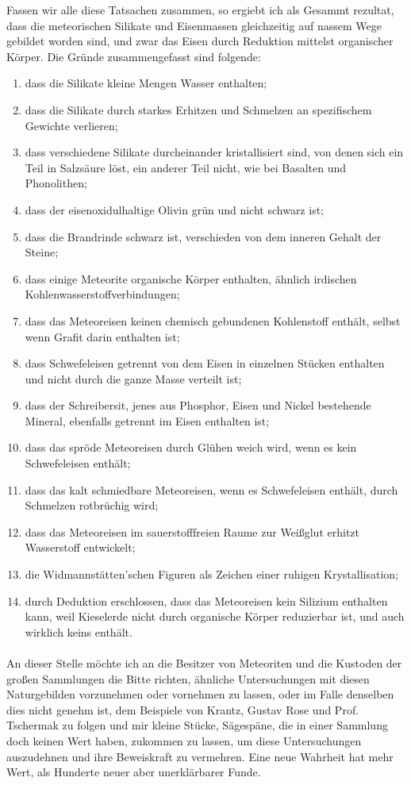 \documentclass[a4paper, 11pt, oneside, german]{article}
\begin{document}
Fassen wir alle diese Tatsachen zusammen, so ergiebt ich als Gesammt rezultat, dass die meteorischen Silikate und Eisenmassen gleichzeitig auf nassem Wege gebildet worden sind, und zwar das Eisen durch Reduktion mittelst organischer Körper. Die Gründe zusammengefasst sind folgende:
\begin{enumerate}
    \item dass die Silikate kleine Mengen Wasser enthalten;
    \item dass die Silikate durch starkes Erhitzen und Schmelzen an spezifischem Gewichte verlieren;
    \item dass verschiedene Silikate durcheinander kristallisiert sind, von denen sich ein Teil in Salzsäure löst, ein anderer Teil nicht, wie bei Basalten und Phonolithen;
    \item dass der eisenoxidulhaltige Olivin grün und nicht schwarz ist;
    \item dass die Brandrinde schwarz ist, verschieden von dem inneren Gehalt der Steine;
    \item dass einige Meteorite organische Körper enthalten, ähnlich irdischen Kohlenwasserstoffverbindungen;
    \item dass das Meteoreisen keinen chemisch gebundenen Kohlenstoff enthält, selbst wenn Grafit darin enthalten ist;
    \item dass Schwefeleisen getrennt von dem Eisen in einzelnen Stücken enthalten und nicht durch die ganze Masse verteilt ist;
    \item dass der Schreibersit, jenes aus Phosphor, Eisen und Nickel bestehende Mineral, ebenfalls getrennt im Eisen enthalten ist;
    \item dass das spröde Meteoreisen durch Glühen weich wird, wenn es kein Schwefeleisen enthält;
    \item dass das kalt schmiedbare Meteoreisen, wenn es Schwefeleisen enthält, durch Schmelzen rotbrüchig wird;
    \item dass das Meteoreisen im sauerstofffreien Raume zur Weißglut erhitzt Wasserstoff entwickelt;
    \item die Widmannstätten'schen Figuren als Zeichen einer ruhigen Krystallisation;
    \item durch Deduktion erschlossen, dass das Meteoreisen kein Silizium enthalten kann, weil Kieselerde nicht durch organische Körper reduzierbar ist, und auch wirklich keins enthält.
\end{enumerate}
\paragraph{}
An dieser Stelle möchte ich an die Besitzer von Meteoriten und die Kustoden der großen Sammlungen die Bitte richten, ähnliche Untersuchungen mit diesen Naturgebilden vorzunehmen oder vornehmen zu lassen, oder im Falle denselben dies nicht genehm ist, dem Beispiele von Krantz, Gustav Rose und Prof. Tschermak zu folgen und mir kleine Stücke, Sägespäne, die in einer Sammlung doch keinen Wert haben, zukommen zu lassen, um diese Untersuchungen auszudehnen und ihre Beweiskraft zu vermehren. Eine neue Wahrheit hat mehr Wert, als Hunderte neuer aber unerklärbarer Funde.
\end{document}
